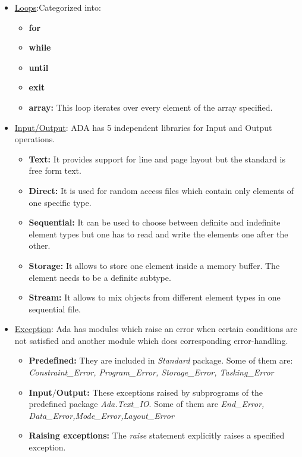 \documentclass{article}
\begin{document}
\begin{itemize}
	\item \uline{Loops}:Categorized into:
		\begin{itemize}
			\item \textbf{for}
			\item \textbf{while}
			\item \textbf{until}
			\item \textbf{exit}
			\item \textbf{array:} This loop iterates over every element of the array specified.
		\end{itemize}
	\item \uline{Input/Output}: ADA has 5 independent libraries for Input and Output operations.
	\begin{itemize}
		\item \textbf{Text:} It provides support for line and page layout but the standard is free form text.
		\item \textbf{Direct:} It is used for random access files which contain only elements of one specific type.
		\item \textbf{Sequential:} It can be used to choose between definite and indefinite element types but one has to read and write the elements one after the other.
		\item \textbf{Storage:} It allows to store one element inside a memory buffer. The element needs to be a
definite subtype.
		\item \textbf{Stream:} It allows to mix objects from different element types in one sequential file.
	\end{itemize}	
	\item \uline{Exception}: Ada has modules which raise an error when certain conditions are not satisfied and another module which does corresponding error-handling.
	\begin{itemize}
		\item \textbf{Predefined:} They are included in \emph{Standard} package. Some of them are: \emph{Constraint\_Error, Program\_Error, Storage\_Error, Tasking\_Error}
		\item \textbf{Input$/$Output:} These exceptions raised by subprograms of the predefined package \emph{Ada.Text\_IO}. Some of them are \emph{End\_Error, Data\_Error,Mode\_Error,Layout\_Error}
		\item \textbf{Raising exceptions:} The \emph{raise} statement explicitly raises a specified exception.
	\end{itemize}
\end{itemize}
\printbibliography
\end{document}
